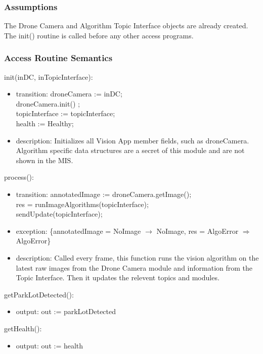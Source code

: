 \documentclass[12pt, titlepage]{article}
\begin{document}
\subsubsection{Assumptions}
The Drone Camera and Algorithm Topic Interface objects are already created.
The init() routine is called before any other access programs.
\subsubsection{Access Routine Semantics}
\noindent init(inDC, inTopicInterface):
\begin{itemize}
\item transition:  droneCamera := inDC; \\ droneCamera.init() ;\\ topicInterface := topicInterface; \\ health := Healthy;
\item description: Initializes all Vision App member fields, such as droneCamera. Algorithm specific data structures are a secret of this module and are not shown in the MIS.
\end{itemize}
\noindent process():
\begin{itemize}
\item transition: annotatedImage := droneCamera.getImage(); \\
res = runImageAlgorithms(topicInterface); \\ sendUpdate(topicInterface);
\item exception: \{annotatedImage = NoImage $\rightarrow$ NoImage, res = AlgoError $\Rightarrow$ AlgoError\} \\
\item description: Called every frame, this function runs the vision algorithm on the latest raw images from the Drone Camera module and information from the Topic Interface. Then it updates the relevent topics and modules.
\end{itemize}
\noindent getParkLotDetected():
\begin{itemize}
\item output: out := parkLotDetected 
\end{itemize}
\noindent getHealth():
\begin{itemize}
\item output: out := health 
\end{itemize}
\end{document}
